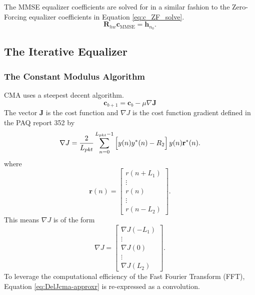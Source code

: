 The MMSE equalizer coefficients are solved for in a similar fashion to the Zero-Forcing equalizer coefficients in Equation \eqref{eq:c_ZF_solve}.
\begin{equation}
\mathbf{R}_{hw}\mathbf{c}_\text{MMSE} = \mathbf{h}_{n_0}.
\label{eq:c_MMSE_solve}
\end{equation}
\clearpage
\subsection{The Iterative Equalizer}

\subsubsection{The Constant Modulus Algorithm}
CMA uses a steepest decent algorithm.
\begin{equation}
\mathbf{c}_{b+1} = \mathbf{c}_{b}-\mu \nabla \mathbf{J}
\end{equation}
The vector $\mathbf{J}$ is the cost function and $\nabla J$ is the cost function gradient defined in the PAQ report 352 by
\begin{equation}
	\nabla J = \frac{2}{L_{pkt}} \sum_{n=0}^{L_{pkt}-1}
	\left[ \vphantom{\displaystyle\sum}  y(n) y^\ast(n) - R_2 \right]
	y(n)  \mathbf{r}^\ast(n).
\label{eq:DelJcma-approxr}
\end{equation}
where
\begin{equation}
\mathbf{r}(n) = \begin{bmatrix} r(n+L_1) \\ \vdots \\ r(n) \\ \vdots \\ r(n-L_2) \end{bmatrix}.
\end{equation}
This means $\nabla J$ is of the form
\begin{equation}
\nabla J = \begin{bmatrix} \nabla J(-L_1) \\ \vdots \\ \nabla J(0) \\ \vdots \\ \nabla J(L_2) \end{bmatrix}.
\end{equation}
To leverage the computational efficiency of the Fast Fourier Transform (FFT), Equation \eqref{eq:DelJcma-approxr} is re-expressed as a convolution.

